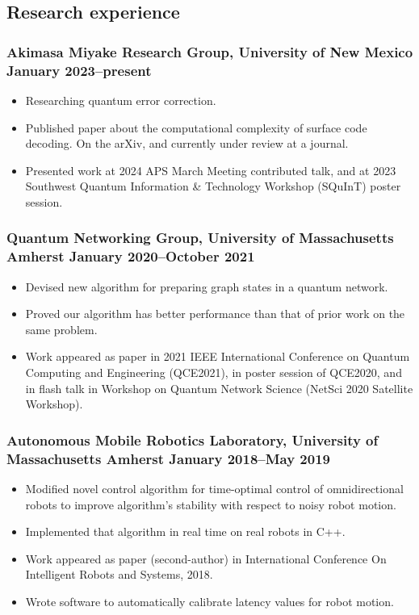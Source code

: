 \documentclass{article}
\begin{document}
	\subsection*{Research experience}
		\subsubsection*{Akimasa Miyake Research Group, University of New Mexico \hfill \normalfont \normalsize January 2023--present}
			\begin{itemize}
				\item Researching quantum error correction.
				\item Published paper about the computational complexity of surface code decoding. On the arXiv, and currently under review at a journal.
				\item Presented work at 2024 APS March Meeting contributed talk, and at 2023 Southwest Quantum Information \& Technology Workshop (SQuInT) poster session.
			\end{itemize}
		\subsubsection*{Quantum Networking Group, University of Massachusetts Amherst \hfill \normalfont \normalsize January 2020--October 2021}
			\begin{itemize}
				\item Devised new algorithm for preparing graph states in a quantum network.
				\item Proved our algorithm has better performance than that of prior work on the same problem.
				\item Work appeared as paper in 2021 IEEE International Conference on Quantum Computing and Engineering (QCE2021), in poster session of QCE2020, and in flash talk in Workshop on Quantum Network Science (NetSci 2020 Satellite Workshop).
			\end{itemize}
		\subsubsection*{Autonomous Mobile Robotics Laboratory, University of Massachusetts Amherst \hfill \normalfont \normalsize January 2018--May 2019}
			\begin{itemize}
				\item Modified novel control algorithm for time-optimal control of omnidirectional robots to improve algorithm's stability with respect to noisy robot motion.
				\item Implemented that algorithm in real time on real robots in C++.
				\item Work appeared as paper (second-author) in International Conference On Intelligent Robots and Systems, 2018.
				\item Wrote software to automatically calibrate latency values for robot motion.
			\end{itemize}
\end{document}
